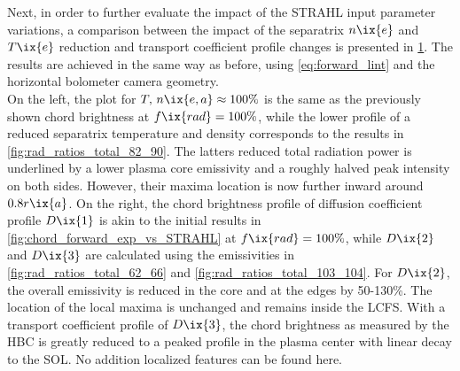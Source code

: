 %
            \begin{figure}[t]%
                \centering%
                \begin{minipage}[b]{0.48\textwidth}%
                    \centering%
                \end{minipage}%
                \hfill%
                \begin{minipage}[b]{0.48\textwidth}%
                    \centering%
                \end{minipage}%
                \label{fig:forward_neTe_vs_transport}%
            \end{figure}%
%
            Next, in order to further evaluate the impact of the STRAHL input parameter variations, a comparison between the impact of the separatrix $n\ix{e}$ and $T\ix{e}$ reduction and transport coefficient profile changes is presented in \cref{fig:forward_neTe_vs_transport}. The results are achieved in the same way as before, using \cref{eq:forward_lint} and the horizontal bolometer camera geometry.\\%
            On the left, the plot for $T,\,n\ix{e,a}\approx100\%$ is the same as the previously shown chord brightness at $f\ix{rad}=100\%$, while the lower profile of a reduced separatrix temperature and density corresponds to the results in \cref{fig:rad_ratios_total_82_90}. The latters reduced total radiation power is underlined by a lower plasma core emissivity and a roughly halved peak intensity on both sides. However, their maxima location is now further inward around $0.8r\ix{a}$. On the right, the chord brightness profile of diffusion coefficient profile $D\ix{1}$ is akin to the initial results in \cref{fig:chord_forward_exp_vs_STRAHL} at $f\ix{rad}=100\%$, while $D\ix{2}$ and $D\ix{3}$ are calculated using the emissivities in \cref{fig:rad_ratios_total_62_66} and \ref{fig:rad_ratios_total_103_104}. For $D\ix{2}$, the overall emissivity is reduced in the core and at the edges by 50-130\%. The location of the local maxima is unchanged and remains inside the LCFS. With a transport coefficient profile of $D\ix{3}$, the chord brightness as measured by the HBC is greatly reduced to a peaked profile in the plasma center with linear decay to the SOL. No addition localized features can be found here.\\%
